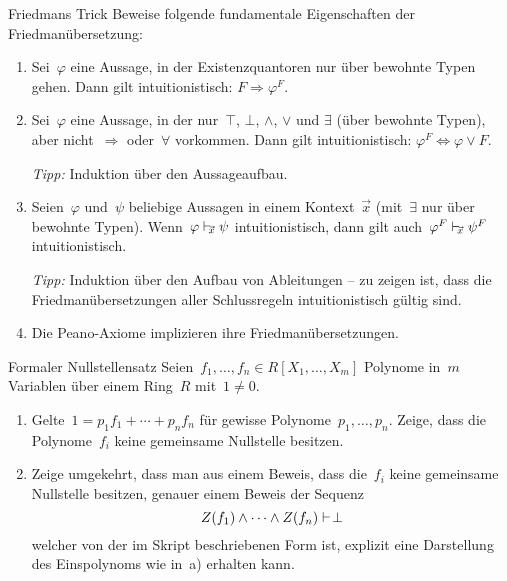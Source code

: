 \documentclass{pizzablatt}
\begin{document}
\begin{aufgabe}{Friedmans Trick}
Beweise folgende fundamentale Eigenschaften der Friedmanübersetzung:
\begin{enumerate}
\item Sei~$\varphi$ eine Aussage, in der Existenzquantoren nur über bewohnte
Typen gehen. Dann gilt intuitionistisch: $F \Longrightarrow \varphi^F$.

\item Sei~$\varphi$ eine Aussage, in der nur~$\top$, $\bot$,
$\wedge$, $\vee$ und $\exists$ (über
bewohnte Typen), aber nicht~$\Rightarrow$ oder~$\forall$ vorkommen.
Dann gilt intuitionistisch: $\varphi^F \Longleftrightarrow \varphi \vee F$.

\emph{Tipp:} Induktion über den Aussageaufbau.

\item Seien~$\varphi$ und~$\psi$ beliebige Aussagen in einem Kontext~$\vec x$
(mit~$\exists$ nur über bewohnte Typen).
Wenn~$\varphi \mathrel{\vdash\!\!\!_{\vec x}} \psi$ intuitionistisch, dann gilt auch~$\varphi^F
\mathrel{\vdash\!\!\!_{\vec x}} \psi^F$ intuitionistisch.

\emph{Tipp:} Induktion über den Aufbau von Ableitungen -- zu zeigen ist, dass
die Friedmanübersetzungen aller Schlussregeln intuitionistisch gültig sind.

\item Die Peano-Axiome implizieren ihre Friedmanübersetzungen.
\end{enumerate}
\end{aufgabe}

\begin{aufgabe}{Formaler Nullstellensatz}
Seien~$f_1,\ldots,f_n \in R[X_1,\ldots,X_m]$ Polynome in~$m$ Variablen über
einem Ring~$R$ mit~$1 \neq 0$.
\begin{enumerate}
\item
Gelte~$1 = p_1 f_1 + \cdots + p_n f_n$ für gewisse Polynome~$p_1,\ldots,p_n$.
Zeige, dass die Polynome~$f_i$ keine gemeinsame Nullstelle besitzen.
\item Zeige umgekehrt, dass man aus einem Beweis, dass die~$f_i$ keine
gemeinsame Nullstelle besitzen, genauer einem Beweis der Sequenz
\[ Z(f_1) \wedge \cdots \wedge Z(f_n) \mathrel{\vdash\!\!\!_{}} \bot \]
welcher von der im Skript beschriebenen Form ist, explizit eine Darstellung des
Eins\-polynoms wie in~a) erhalten kann.
\end{enumerate}
\end{aufgabe}
\end{document}
